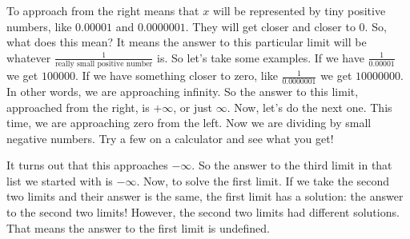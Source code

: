 To approach from the right means that $x$ will be represented by tiny positive numbers, like $0.00001$ and $0.0000001$. 
They will get closer and closer to $0$. 
So, what does this mean? 
It means the answer to this particular limit will be whatever $\frac{1}{\text{really small positive number}}$ is. 
So let's take some examples. 
If we have $\frac{1}{0.00001}$ we get $100000$. 
If we have something closer to zero, like $\frac{1}{0.0000001}$ we get $10000000$. 
In other words, we are approaching infinity.
So the answer to this limit, approached from the right, is $+\infty$, or just $\infty$. 
Now, let's do the next one. 
This time, we are approaching zero from the left. Now we are dividing by small negative numbers. Try a few on a calculator and see what you get!

It turns out that this approaches $-\infty$. 
So the answer to the third limit in that list we started with is $-\infty$. 
Now, to solve the first limit. 
If we take the second two limits and their answer is the same, the first limit has a solution: the answer to the second two limits! 
However, the second two limits had different solutions. That means the answer to the first limit is undefined.
